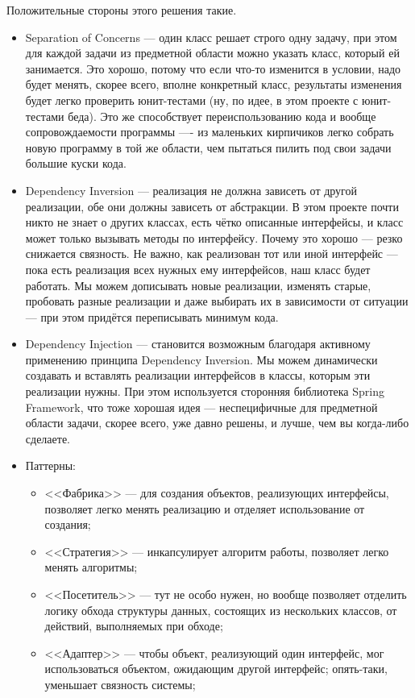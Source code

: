 \documentclass{../text-style}
\begin{document}
Положительные стороны этого решения такие.
\begin{itemize}
    \item Separation of Concerns --- один класс решает строго одну задачу, при этом для каждой задачи из предметной области можно указать класс, который ей занимается. Это хорошо, потому что если что-то изменится в условии, надо будет менять, скорее всего, вполне конкретный класс, результаты изменения будет легко проверить юнит-тестами (ну, по идее, в этом проекте с юнит-тестами беда). Это же способствует переиспользованию кода и вообще сопровождаемости программы ---- из маленьких кирпичиков легко собрать новую программу в той же области, чем пытаться пилить под свои задачи большие куски кода.
    \item Dependency Inversion --- реализация не должна зависеть от другой реализации, обе они должны зависеть от абстракции. В этом проекте почти никто не знает о других классах, есть чётко описанные интерфейсы, и класс может только вызывать методы по интерфейсу. Почему это хорошо --- резко снижается связность. Не важно, как реализован тот или иной интерфейс --- пока есть реализация всех нужных ему интерфейсов, наш класс будет работать. Мы можем дописывать новые реализации, изменять старые, пробовать разные реализации и даже выбирать их в зависимости от ситуации --- при этом придётся переписывать минимум кода.
    \item Dependency Injection --- становится возможным благодаря активному применению принципа Dependency Inversion. Мы можем динамически создавать и вставлять реализации интерфейсов в классы, которым эти реализации нужны. При этом используется сторонняя библиотека Spring Framework, что тоже хорошая идея --- неспецифичные для предметной области задачи, скорее всего, уже давно решены, и лучше, чем вы когда-либо сделаете.
    \item Паттерны:
    \begin{itemize}
        \item <<Фабрика>> --- для создания объектов, реализующих интерфейсы, позволяет легко менять реализацию и отделяет использование от создания;
        \item <<Стратегия>> --- инкапсулирует алгоритм работы, позволяет легко менять алгоритмы;
        \item <<Посетитель>> --- тут не особо нужен, но вообще позволяет отделить логику обхода структуры данных, состоящих из нескольких классов, от действий, выполняемых при обходе; 
        \item <<Адаптер>> --- чтобы объект, реализующий один интерфейс, мог использоваться объектом, ожидающим другой интерфейс; опять-таки, уменьшает связность системы;

\end{itemize}
\end{itemize}
\end{document}

